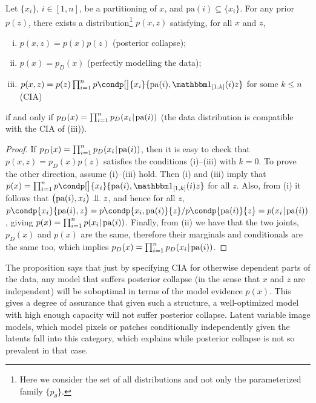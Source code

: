 \begin{proposition}
Let $\{x_i\}$, $i \in [1,n]$, be a partitioning of $x$, and $\mathrm{pa}(i) \subseteq \{x_i\}$.
For any prior $p(z)$, there exists a distribution\footnote{Here we consider the set of all distributions and not only the parameterized family $\{p_\theta\}$.}
$p(x,z)$ satisfying, for all $x$ and $z$,
\begin{enumerate}[(i)]
\item $p(x,z)=p(x)p(z)$ \hspace{0.1em} (posterior collapse);
\item $p(x)=p_D(x)$ \hspace{0.1em} (perfectly modelling the data);
\item $p(x,z)= p(z) \prod_{i=1}^n p\condp[\big]{x_i}{\mathrm{pa}(i),\indcia}$ for some $k \leqslant n$ \hspace{0.1em} (CIA)
\end{enumerate}
if and only if $p_D(x)=\prod_{i=1}^n p_D(x_i\hspace{0.08em}|\hspace{0.11em} \mathrm{pa}(i))$ \hspace{0.1em} (the data distribution is compatible with the CIA of (iii)).
\end{proposition}
\begin{proof}
If $p_D(x)=\prod_{i=1}^n p_D(x_i\hspace{0.08em}|\hspace{0.11em} \mathrm{pa}(i))$, then it is easy to check that $p(x,z)=p_D(x)\allowbreak{}p(z)$ satisfies the conditions (i)--(iii) with $k=0$.
To prove the other direction, assume (i)--(iii) hold.
Then (i) and (iii) imply that $p(x)=\prod_{i=1}^n p\condp[\big]{x_i}{\mathrm{pa}(i),\indcia}$ for all $z$.
Also, from (i) it follows that $\bigl(\textrm{pa}(i), x_i\bigr) \perp \!\!\! \perp z$, and hence for all $z$, $p\condp{x_i}{\mathrm{pa}(i),z} = p\condp{x_i,\mathrm{pa}(i)}{z}/p\condp{\mathrm{pa}(i)}{z}=p(x_i\tmid \mathrm{pa}(i))$, giving $p(x)=\prod_{i=1}^n p(x_i\hspace{0.08em}|\hspace{0.11em} \mathrm{pa}(i))$.
Finally, from (ii) we have that the two joints, $p_D(x)$ and $p(x)$ are the same, therefore their marginals and conditionals are the same too, which implies $p_D(x) = \prod_{i=1}^n\allowbreak p_D(x_i\hspace{0.08em}|\hspace{0.11em} \mathrm{pa}(i))$.
\end{proof}

The proposition says that just by specifying CIA for otherwise dependent parts of the data, any model that suffers posterior collapse (in the sense that $x$ and $z$ are independent) will be suboptimal in terms of the model evidence $p(x)$.
This gives a degree of assurance that given such a structure, a well-optimized model with high enough capacity will not suffer posterior collapse.
Latent variable image models, which model pixels or patches conditionally independently given the latents fall into this category, which explains while posterior collapse is not so prevalent in that case.

